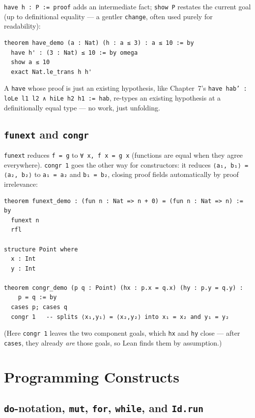 \documentclass[12pt, a4paper, openright]{book}
\theoremstyle{thmstyle}
\theoremstyle{defstyle}
\newcommand{\lc}[1]{\texttt{#1}}
\begin{document}
\lc{have h : P := proof} adds an intermediate fact; \lc{show P} restates
the current goal (up to definitional equality --- a gentler \lc{change},
often used purely for readability):

\begin{verbatim}
theorem have_demo (a : Nat) (h : a ≤ 3) : a ≤ 10 := by
  have h' : (3 : Nat) ≤ 10 := by omega
  show a ≤ 10
  exact Nat.le_trans h h'
\end{verbatim}

A \lc{have} whose proof is just an existing hypothesis, like Chapter~7's
\lc{have hab' : loLe l1 l2 ∧ hiLe h2 h1 := hab}, re-types an existing
hypothesis at a definitionally equal type --- no work, just unfolding.

\subsection*{\lc{funext} and \lc{congr}}

\lc{funext} reduces \lc{f = g} to \lc{∀ x, f x = g x} (functions are equal
when they agree everywhere). \lc{congr 1} goes the other way for
constructors: it reduces \lc{⟨a₁, b₁⟩ = ⟨a₂, b₂⟩} to \lc{a₁ = a₂} and
\lc{b₁ = b₂}, closing proof fields automatically by proof irrelevance:

\begin{verbatim}
theorem funext_demo : (fun n : Nat => n + 0) = (fun n : Nat => n) := by
  funext n
  rfl

structure Point where
  x : Int
  y : Int

theorem congr_demo (p q : Point) (hx : p.x = q.x) (hy : p.y = q.y) :
    p = q := by
  cases p; cases q
  congr 1   -- splits ⟨x₁,y₁⟩ = ⟨x₂,y₂⟩ into x₁ = x₂ and y₁ = y₂
\end{verbatim}

(Here \lc{congr 1} leaves the two component goals, which \lc{hx} and
\lc{hy} close --- after \lc{cases}, they already \emph{are} those goals,
so Lean finds them by assumption.)

\section{Programming Constructs}
\label{app:programming}

\subsection*{\lc{do}-notation, \lc{mut}, \lc{for}, \lc{while}, and \lc{Id.run}}
\end{document}

